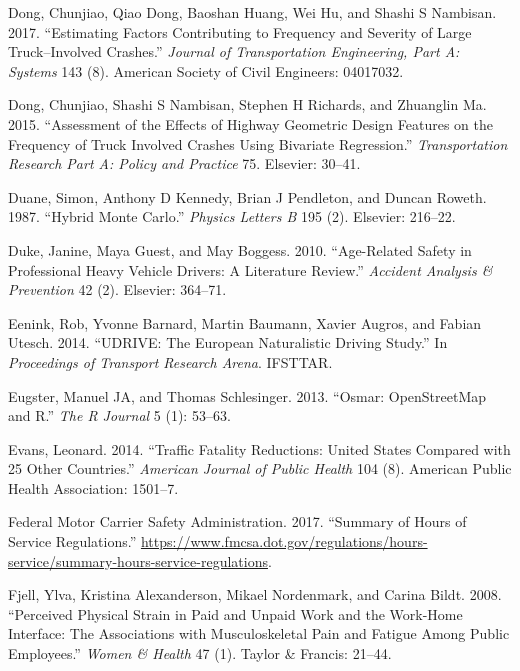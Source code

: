 \documentclass[12pt]{book}
\numberwithin{equation}{chapter}
\begin{document}
\leavevmode\hypertarget{ref-dong2017estimating}{}%
Dong, Chunjiao, Qiao Dong, Baoshan Huang, Wei Hu, and Shashi S Nambisan. 2017. ``Estimating Factors Contributing to Frequency and Severity of Large Truck--Involved Crashes.'' \emph{Journal of Transportation Engineering, Part A: Systems} 143 (8). American Society of Civil Engineers: 04017032.

\leavevmode\hypertarget{ref-dong2015assessment}{}%
Dong, Chunjiao, Shashi S Nambisan, Stephen H Richards, and Zhuanglin Ma. 2015. ``Assessment of the Effects of Highway Geometric Design Features on the Frequency of Truck Involved Crashes Using Bivariate Regression.'' \emph{Transportation Research Part A: Policy and Practice} 75. Elsevier: 30--41.

\leavevmode\hypertarget{ref-duane1987hybrid}{}%
Duane, Simon, Anthony D Kennedy, Brian J Pendleton, and Duncan Roweth. 1987. ``Hybrid Monte Carlo.'' \emph{Physics Letters B} 195 (2). Elsevier: 216--22.

\leavevmode\hypertarget{ref-duke2010age}{}%
Duke, Janine, Maya Guest, and May Boggess. 2010. ``Age-Related Safety in Professional Heavy Vehicle Drivers: A Literature Review.'' \emph{Accident Analysis \& Prevention} 42 (2). Elsevier: 364--71.

\leavevmode\hypertarget{ref-eenink2014udrive}{}%
Eenink, Rob, Yvonne Barnard, Martin Baumann, Xavier Augros, and Fabian Utesch. 2014. ``UDRIVE: The European Naturalistic Driving Study.'' In \emph{Proceedings of Transport Research Arena}. IFSTTAR.

\leavevmode\hypertarget{ref-eugster2013osmar}{}%
Eugster, Manuel JA, and Thomas Schlesinger. 2013. ``Osmar: OpenStreetMap and R.'' \emph{The R Journal} 5 (1): 53--63.

\leavevmode\hypertarget{ref-evans2014traffic}{}%
Evans, Leonard. 2014. ``Traffic Fatality Reductions: United States Compared with 25 Other Countries.'' \emph{American Journal of Public Health} 104 (8). American Public Health Association: 1501--7.

\leavevmode\hypertarget{ref-hos2017}{}%
Federal Motor Carrier Safety Administration. 2017. ``Summary of Hours of Service Regulations.'' \url{https://www.fmcsa.dot.gov/regulations/hours-service/summary-hours-service-regulations}.

\leavevmode\hypertarget{ref-fjell2008perceived}{}%
Fjell, Ylva, Kristina Alexanderson, Mikael Nordenmark, and Carina Bildt. 2008. ``Perceived Physical Strain in Paid and Unpaid Work and the Work-Home Interface: The Associations with Musculoskeletal Pain and Fatigue Among Public Employees.'' \emph{Women \& Health} 47 (1). Taylor \& Francis: 21--44.
\end{document}
